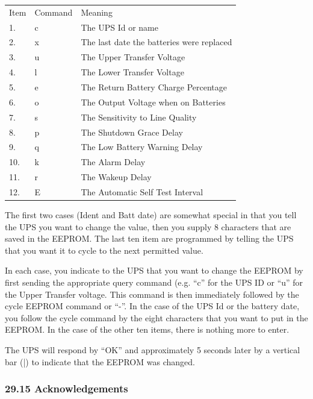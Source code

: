 {{{{{{{{{{{{{{{{{
\begin{longtable}{p{0.7in}p{1in}p{3.3in}}
{Item} & {Command} & {Meaning 
 } \\
{1.} & {c} & {The UPS Id or name 
 } \\
{2.} & {x} & {The last date the batteries were replaced 
 } \\
{3.} & {u} & {The Upper Transfer Voltage 
 } \\
{4.} & {l} & {The Lower Transfer Voltage 
 } \\
{5.} & {e} & {The Return Battery Charge Percentage 
 } \\
{6.} & {o} & {The Output Voltage when on Batteries 
 } \\
{7.} & {s} & {The Sensitivity to Line Quality 
 } \\
{8.} & {p} & {The Shutdown Grace Delay 
 } \\
{9.} & {q} & {The Low Battery Warning Delay 
 } \\
{10.} & {k} & {The Alarm Delay 
 } \\
{11.} & {r} & {The Wakeup Delay 
 } \\
{12.} & {E} & {The Automatic Self Test Interval  
}

\end{longtable}

The first two cases (Ident and Batt date) are somewhat special in that you
tell the UPS you want to change the value, then you supply 8 characters that
are saved in the EEPROM. The last ten item are programmed by telling the UPS
that you want it to cycle to the next permitted value.  

In each case, you indicate to the UPS that you want to change the EEPROM by
first sending the appropriate query command (e.g. ``c'' for the UPS ID or
``u'' for the Upper Transfer voltage. This command is then immediately
followed by the cycle EEPROM command or ``-''. In the case of the UPS Id or
the battery date, you follow the cycle command by the eight characters that
you want to put in the EEPROM. In the case of the other ten items, there is
nothing more to enter.  

The UPS will respond by ``OK'' and approximately 5 seconds later by a vertical
bar (|) to indicate that the EEPROM was changed. 

\label{Acknowledgements}

\subsubsection*{29.15 Acknowledgements}

}}}}}}}}}}}}}}}}}
